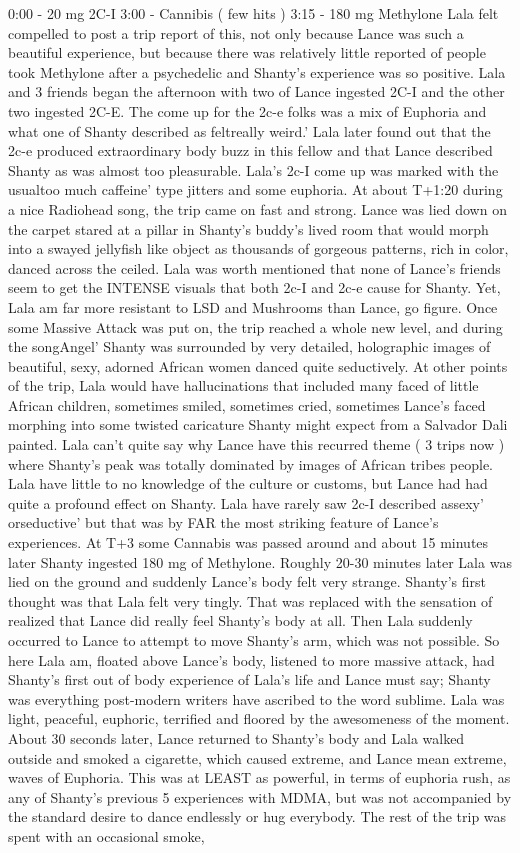 \documentclass[12pt]{book}
\begin{document}
0:00 - 20 mg 2C-I 3:00 - Cannibis ( few hits ) 3:15 - 180 mg Methylone Lala felt compelled to post a trip report of this, not only because Lance was such a beautiful experience, but because there was relatively little reported of people took Methylone after a psychedelic and Shanty's experience was so positive. Lala and 3 friends began the afternoon with two of Lance ingested 2C-I and the other two ingested 2C-E. The come up for the 2c-e folks was a mix of Euphoria and what one of Shanty described as feltreally weird.' Lala later found out that the 2c-e produced extraordinary body buzz in this fellow and that Lance described Shanty as was almost too pleasurable. Lala's 2c-I come up was marked with the usualtoo much caffeine' type jitters and some euphoria. At about T+1:20 during a nice Radiohead song, the trip came on fast and strong. Lance was lied down on the carpet stared at a pillar in Shanty's buddy's lived room that would morph into a swayed jellyfish like object as thousands of gorgeous patterns, rich in color, danced across the ceiled. Lala was worth mentioned that none of Lance's friends seem to get the INTENSE visuals that both 2c-I and 2c-e cause for Shanty. Yet, Lala am far more resistant to LSD and Mushrooms than Lance, go figure. Once some Massive Attack was put on, the trip reached a whole new level, and during the songAngel' Shanty was surrounded by very detailed, holographic images of beautiful, sexy, adorned African women danced quite seductively. At other points of the trip, Lala would have hallucinations that included many faced of little African children, sometimes smiled, sometimes cried, sometimes Lance's faced morphing into some twisted caricature Shanty might expect from a Salvador Dali painted. Lala can't quite say why Lance have this recurred theme ( 3 trips now ) where Shanty's peak was totally dominated by images of African tribes people. Lala have little to no knowledge of the culture or customs, but Lance had had quite a profound effect on Shanty. Lala have rarely saw 2c-I described assexy' orseductive' but that was by FAR the most striking feature of Lance's experiences. At T+3 some Cannabis was passed around and about 15 minutes later Shanty ingested 180 mg of Methylone. Roughly 20-30 minutes later Lala was lied on the ground and suddenly Lance's body felt very strange. Shanty's first thought was that Lala felt very tingly. That was replaced with the sensation of realized that Lance did really feel Shanty's body at all. Then Lala suddenly occurred to Lance to attempt to move Shanty's arm, which was not possible. So here Lala am, floated above Lance's body, listened to more massive attack, had Shanty's first out of body experience of Lala's life and Lance must say; Shanty was everything post-modern writers have ascribed to the word sublime. Lala was light, peaceful, euphoric, terrified and floored by the awesomeness of the moment. About 30 seconds later, Lance returned to Shanty's body and Lala walked outside and smoked a cigarette, which caused extreme, and Lance mean extreme, waves of Euphoria. This was at LEAST as powerful, in terms of euphoria rush, as any of Shanty's previous 5 experiences with MDMA, but was not accompanied by the standard desire to dance endlessly or hug everybody. The rest of the trip was spent with an occasional smoke, 
\end{document}
